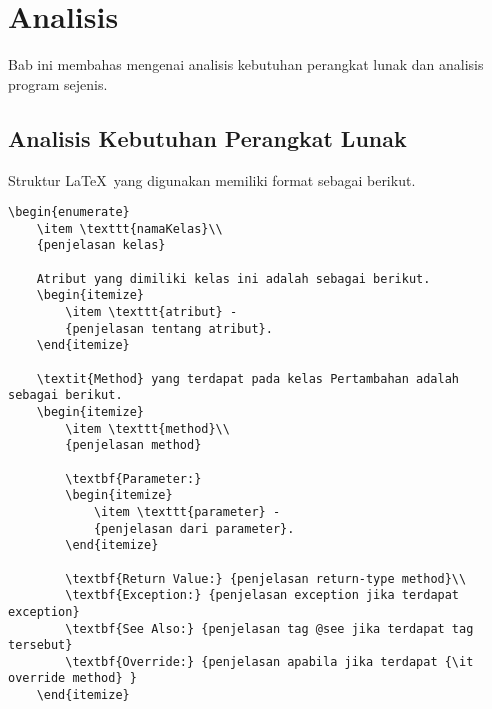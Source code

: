 \lstset{style=mystyle}
\chapter{Analisis}
\label{sec:analisis}

Bab ini membahas mengenai analisis kebutuhan perangkat lunak dan analisis program sejenis.

\section{Analisis Kebutuhan Perangkat Lunak}
\label{sec:analisis}

Struktur \LaTeX\ yang digunakan memiliki format sebagai berikut.
\begin{lstlisting}[caption=Potongan kode \LaTeX, label={kode-latex}]
	\begin{enumerate}
	\item \texttt{namaKelas}\\
	{penjelasan kelas}
	
	Atribut yang dimiliki kelas ini adalah sebagai berikut.
	\begin{itemize}
		\item \texttt{atribut} -
		{penjelasan tentang atribut}.
	\end{itemize}
	
	\textit{Method} yang terdapat pada kelas Pertambahan adalah sebagai berikut.
	\begin{itemize}
		\item \texttt{method}\\
		{penjelasan method}
		
		\textbf{Parameter:}
		\begin{itemize}
			\item \texttt{parameter} - 
			{penjelasan dari parameter}.
		\end{itemize}
		
		\textbf{Return Value:} {penjelasan return-type method}\\
		\textbf{Exception:} {penjelasan exception jika terdapat exception}
		\textbf{See Also:} {penjelasan tag @see jika terdapat tag tersebut}
		\textbf{Override:} {penjelasan apabila jika terdapat {\it override method} }
	\end{itemize}

\end{lstlisting}

